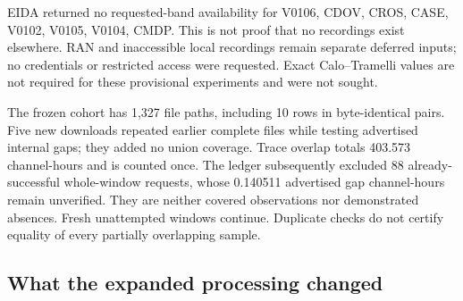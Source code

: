 EIDA returned no requested-band availability for V0106, CDOV, CROS, CASE, V0102, V0105, V0104, CMDP. This is not proof that no recordings exist elsewhere. RAN and inaccessible local recordings remain separate deferred inputs; no credentials or restricted access were requested. Exact Calo--Tramelli values are not required for these provisional experiments and were not sought.

\par{\footnotesize{}}

\par{\footnotesize{}}

\par{\footnotesize{}}

\par{\footnotesize{}}

\par{\footnotesize{}}

\par{\footnotesize{}}

The frozen cohort has 1,327 file paths, including 10 rows in byte-identical pairs. Five new downloads repeated earlier complete files while testing advertised internal gaps; they added no union coverage. Trace overlap totals 403.573 channel-hours and is counted once. The ledger subsequently excluded 88 already-successful whole-window requests, whose 0.140511 advertised gap channel-hours remain unverified. They are neither covered observations nor demonstrated absences. Fresh unattempted windows continue. Duplicate checks do not certify equality of every partially overlapping sample.

\par{\footnotesize{}}

\par{\footnotesize{}}

\subsection*{What the expanded processing changed}

